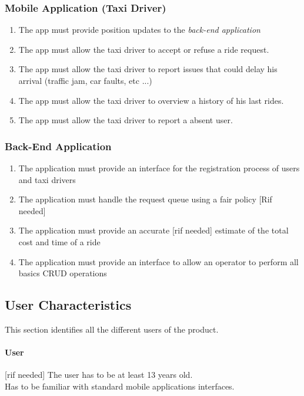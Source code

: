 \documentclass[12pt, a4paper]{article}
\begin{document}
\subsubsection{Mobile Application (Taxi Driver)} 
\label{ssub:mobile_application_}
\begin{enumerate} [resume*]
	\item  The app must provide position updates to the \emph{back-end application}
	\item  The app must allow the taxi driver to accept or refuse a ride request.
	\item  The app must allow the taxi driver to report issues that could delay his arrival (traffic jam, car faults, etc ...)
	\item  The app must allow the taxi driver to overview a history of his last rides.
	\item  The app must allow the taxi driver to report a absent user.
\end{enumerate}

\subsubsection{Back-End Application} 
\label{ssub:back_end_application}
\begin{enumerate} [resume*]
	\item  The application must provide an interface for the registration process of users and taxi drivers
	\item  The application must handle the request queue using a fair policy [Rif needed]
	\item  The application must provide an accurate [rif needed] estimate of the total cost and time of a ride
	\item  The application must provide an interface to allow an operator to perform all basics CRUD operations

\end{enumerate}

\subsection{User Characteristics} 
\label{sub:user_characteristics}
This section identifies all the different users of the product.
\paragraph{User}\label{par:user} [rif needed] The user has to be at least 13 years old.\\ 
Has to be familiar with standard mobile applications interfaces.
\end{document}
